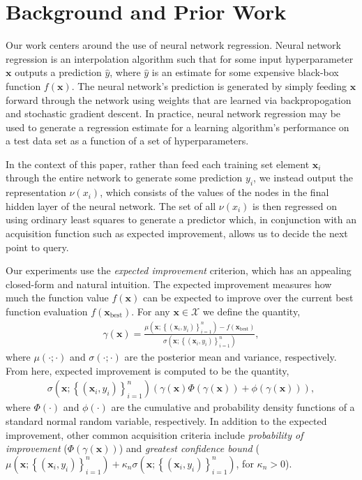 \documentclass[]{article}
\newcommand{\paren}[1]{\left({#1}\right)}
\newcommand{\set}[1]{\left\{{#1}\right\}}
\newcommand{\1}{\mathbf{1}}
\newcommand{\0}{\mathbf{0}}
\newcommand{\X}{\mathcal{X}}
\newcommand{\x}{\mathbf{x}}
\begin{document}
\section{Background and Prior Work}
\label{sec:back-prio-work}

Our work centers around the use of neural network regression. Neural network regression is an interpolation algorithm such that for some input hyperparameter $\x$ outputs a prediction $\hat{y}$, where $\hat{y}$ is an estimate for some expensive black-box function $f\paren{\x}$. The neural network's prediction is generated by simply feeding $\x$ forward through the network using weights that are learned via backpropogation and stochastic gradient descent. In practice, neural network regression may be used to generate a regression estimate for a learning algorithm's performance on a test data set as a function of a set of hyperparameters.

In the context of this paper, rather than feed each training set element $\x_i$ through the entire network to generate some prediction $y_i$, we instead output the representation $\nu(x_i)$, which consists of the values of the nodes in the final hidden layer of the neural network. The set of all $\nu(x_i)$ is then regressed on using ordinary least squares to generate a predictor which, in conjunction with an acquisition function such as expected improvement, allows us to decide the next point to query.

Our experiments use the \textit{expected improvement} criterion, which has an appealing closed-form and natural intuition. The expected improvement measures how much the function value $f\paren{\x}$ can be expected to improve over the current best function evaluation $f\paren{\x_{\text{best}}}$. For any $\x\in\X$ we define the quantity,
\begin{eqnarray}
	\gamma\paren{\x} = \frac{\mu\paren{\x ; \set{\paren{\x_i,y_i}}_{i=1}^n} - f\paren{\x_{\text{best}}}}{\sigma\paren{\x ; \set{\paren{\x_i,y_i}}_{i=1}^n}},
\end{eqnarray}
where $\mu\paren{\cdot;\cdot}$ and $\sigma\paren{\cdot;\cdot}$ are the posterior mean and variance, respectively. From here, expected improvement is computed to be the quantity,
\begin{eqnarray}
	\sigma\paren{\x ; \set{\paren{\x_i,y_i}}_{i=1}^n}\paren{\gamma\paren{\x}\Phi\paren{\gamma\paren{\x}} + \phi\paren{\gamma\paren{\x}}},
\end{eqnarray}
where $\Phi\paren{\cdot}$ and $\phi\paren{\cdot}$ are the cumulative and probability density functions of a standard normal random variable, respectively. In addition to the expected improvement, other common acquisition criteria include \textit{probability of improvement} ($\Phi\paren{\gamma\paren{\x}}$) and \textit{greatest confidence bound} ($\mu\paren{\x;\set{\paren{\x_i,y_i}}_{i=1}^n} + \kappa_n \sigma\paren{\x;\set{\paren{\x_i,y_i}}_{i=1}^n}$, for $\kappa_n > 0$).
\end{document}
